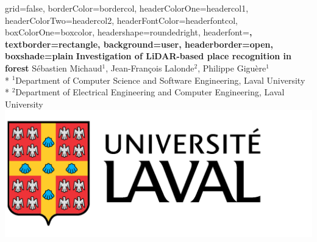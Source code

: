 \documentclass[a0paper,portrait]{baposter}
\begin{document}
\begin{poster}{
        grid=false,
        borderColor=bordercol, %
        headerColorOne=headercol1, %
        headerColorTwo=headercol2, %
        headerFontColor=headerfontcol, %
        boxColorOne=boxcolor, %
        headershape=roundedright, %
        headerfont=\Large\sf\bf, %
        textborder=rectangle,
        background=user,
        headerborder=open, %
        boxshade=plain
    }
    {}
    {\sf\bf Investigation of LiDAR-based place recognition in forest}
    {\vspace{0.2em} Sébastien Michaud$^1$, Jean-François Lalonde$^2$, Philippe Giguère$^1$\\* %
        {\vspace{-0.4em}\small $^1$Department of Computer Science and Software Engineering, Laval University}\\*
        {\vspace{-0.2em}\small $^2$Department of Electrical Engineering and Computer Engineering, Laval University}}
    {\includegraphics[scale=0.12]{./figures/logo.png}} %

\end{poster}
\end{document}
